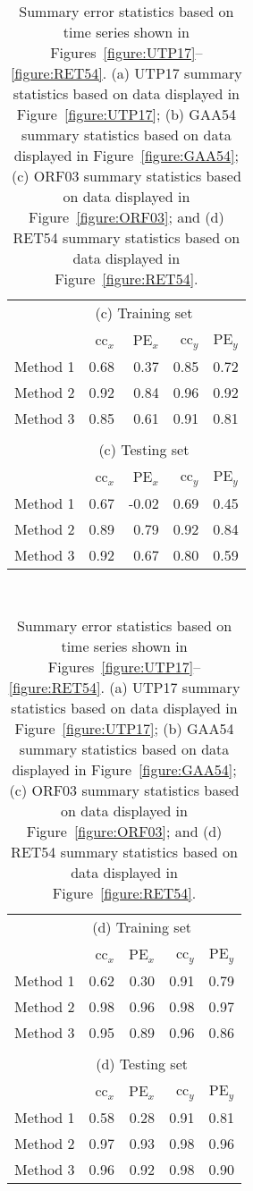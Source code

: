 \documentclass[linenumbers,draft]{agujournal}
\begin{document}
\begin{table}
  \begin{tabular}{ l r r r r }
& \multicolumn{3}{c}{(c) Training set}\\
& cc$_x$ & PE$_x$ & cc$_y$ & PE$_y$\\
\hline
Method 1 & 0.68 & 0.37 & 0.85 & 0.72\\
Method 2 & 0.92 & 0.84 & 0.96 & 0.92\\
Method 3 & 0.85 & 0.61 & 0.91 & 0.81\\
\\
& \multicolumn{3}{c}{(c) Testing set}\\
& cc$_x$ & PE$_x$ & cc$_y$ & PE$_y$\\
\hline
Method 1 & 0.67 & -0.02 & 0.69 & 0.45\\
Method 2 & 0.89 & 0.79 & 0.92 & 0.84\\
Method 3 & 0.92 & 0.67 & 0.80 & 0.59\\
%    
  \end{tabular}
\\
  \begin{tabular}{ l r r r r }
& \multicolumn{3}{c}{(d) Training set}\\
& cc$_x$ & PE$_x$ & cc$_y$ & PE$_y$\\
\hline
Method 1 & 0.62 & 0.30 & 0.91 & 0.79\\
Method 2 & 0.98 & 0.96 & 0.98 & 0.97\\
Method 3 & 0.95 & 0.89 & 0.96 & 0.86\\
\\
& \multicolumn{3}{c}{(d) Testing set}\\
& cc$_x$ & PE$_x$ & cc$_y$ & PE$_y$\\
\hline
Method 1 & 0.58 & 0.28 & 0.91 & 0.81\\
Method 2 & 0.97 & 0.93 & 0.98 & 0.96\\
Method 3 & 0.96 & 0.92 & 0.98 & 0.90\\
%   
  \end{tabular}
\\
\vspace{1em}
  \caption{Summary error statistics based on time series shown in Figures~\ref{figure:UTP17}--\ref{figure:RET54}. (a) UTP17 summary statistics based on data displayed in Figure~\ref{figure:UTP17}; (b) GAA54 summary statistics based on data displayed in Figure~\ref{figure:GAA54}; (c) ORF03 summary statistics based on data displayed in Figure~\ref{figure:ORF03}; and (d) RET54 summary statistics based on data displayed in Figure~\ref{figure:RET54}.}
\label{table:SummaryStatistics}
\end{table}
\end{document}
